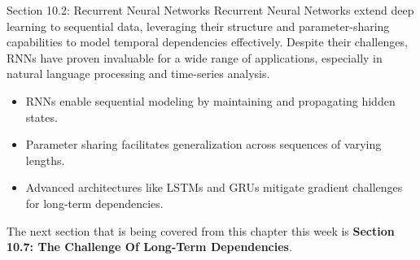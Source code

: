 \begin{notes}{Section 10.2: Recurrent Neural Networks}
    Recurrent Neural Networks extend deep learning to sequential data, leveraging their structure and parameter-sharing capabilities to model temporal dependencies effectively. Despite their challenges, RNNs 
    have proven invaluable for a wide range of applications, especially in natural language processing and time-series analysis.
    
    \begin{highlight}
        \begin{itemize}
            \item RNNs enable sequential modeling by maintaining and propagating hidden states.
            \item Parameter sharing facilitates generalization across sequences of varying lengths.
            \item Advanced architectures like LSTMs and GRUs mitigate gradient challenges for long-term dependencies.
        \end{itemize}
    \end{highlight}
\end{notes}

The next section that is being covered from this chapter this week is \textbf{Section 10.7: The Challenge Of Long-Term Dependencies}.


